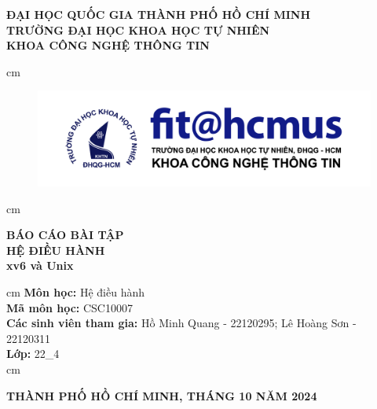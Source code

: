 \begin{titlepage}
	\begin{mybox}
		\begin{center}
			\fontsize{12}{12}\selectfont
			\textbf{ĐẠI HỌC QUỐC GIA THÀNH PHỐ HỒ CHÍ MINH}\\
			\textbf{TRƯỜNG ĐẠI HỌC KHOA HỌC TỰ NHIÊN}\\
			\textbf{KHOA CÔNG NGHỆ THÔNG TIN}
		\end{center}
		 cm
		\begin{figure}[H]
			\begin{center}
				\includegraphics[scale=0.5]{figures/fit-logo-chuan-V3}
			\end{center}
		\end{figure}
		 cm
		\begin{center}
			\fontsize{16}{12}\selectfont
			\textbf{BÁO CÁO BÀI TẬP}\\
			\fontsize{24}{20}\selectfont
			\textbf{HỆ ĐIỀU HÀNH}\\
			\fontsize{16}{12}\selectfont
			\textbf{xv6 và Unix}
		\end{center}
		 cm
		\fontsize{14}{12}\selectfont
		\textbf{Môn học:} Hệ điều hành\\
		\textbf{Mã môn học:} CSC10007\\
		\textbf{Các sinh viên tham gia:} Hồ Minh Quang - 22120295; Lê Hoàng Sơn - 22120311\\
		\textbf{Lớp:} 22\_4\\
		 cm
		\begin{center}
			\textbf{THÀNH PHỐ HỒ CHÍ MINH, THÁNG 10 NĂM 2024}
		\end{center}
	\end{mybox}
\end{titlepage}